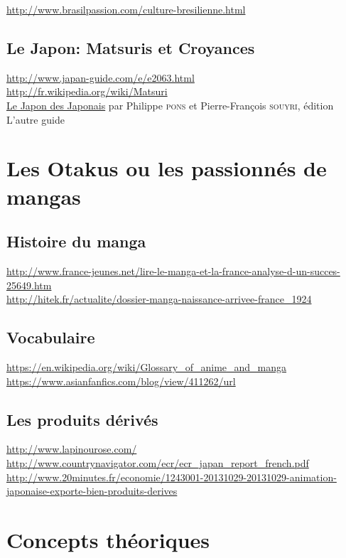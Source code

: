 \noindent
\url{http://www.brasilpassion.com/culture-bresilienne.html}

\subsection{Le Japon: Matsuris et Croyances}

\noindent
\url{http://www.japan-guide.com/e/e2063.html}\\
\url{http://fr.wikipedia.org/wiki/Matsuri}\\
\underline{Le Japon des Japonais} par Philippe \textsc{pons} et Pierre-François \textsc{souyri}, édition L'autre guide

\section{Les Otakus ou les passionnés de mangas}

\subsection{Histoire du manga}

\noindent
\url{http://www.france-jeunes.net/lire-le-manga-et-la-france-analyse-d-un-succes-25649.htm}\\
\url{http://hitek.fr/actualite/dossier-manga-naissance-arrivee-france_1924}

\subsection{Vocabulaire}

\noindent
\url{https://en.wikipedia.org/wiki/Glossary_of_anime_and_manga}\\
\url{https://www.asianfanfics.com/blog/view/411262/url}

\subsection{Les produits dérivés}

\noindent
\url{http://www.lapinourose.com/}\\
\url{http://www.countrynavigator.com/ecr/ecr_japan_report_french.pdf}\\
\url{http://www.20minutes.fr/economie/1243001-20131029-20131029-animation-japonaise-exporte-bien-produits-derives}

\section{Concepts théoriques}

